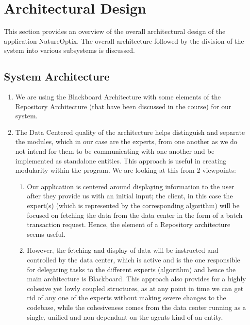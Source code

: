 \documentclass[]{article}
\begin{document}



\section{Architectural Design}
\label{sec:architectural_design}
This section provides an overview of the overall architectural design of the application NatureOptix. The overall architecture followed by the division of the system into various subsystems is discussed.

\subsection{System Architecture}
\label{sub:system_architecture}
\begin{enumerate}[1.]

	\item We are using the Blackboard Architecture with some elements of the Repository Architecture (that have been discussed in the course) for our system.
	\item The Data Centered quality of the architecture helps distinguish and separate the modules, which in our case are the experts, from one another as we do not intend for them to be communicating with one another and be implemented as standalone entities. This approach is useful in creating modularity within the program. We are looking at this from 2 viewpoints:
	\begin{enumerate}[2.1]
		\item Our application is centered around displaying information to the user after they provide us with an initial input; the client, in this case the expert(s) (which is represented by the corresponding algorithm) will be focused on fetching the data from the data center in the form of a batch transaction request. Hence, the element of a Repository architecture seems useful.
		\item However, the fetching and display of data will be instructed and controlled by the data center, which is active and is the one responsible for delegating tasks to the different experts (algorithm) and hence the main architecture is Blackboard. This approach also provides for a highly cohesive yet lowly coupled structures, as at any point in time we can get rid of any one of the experts without making severe changes to the codebase, while the cohesiveness comes from the data center running as a single, unified and non dependant on the agents kind of an entity.

	\end{enumerate}
\end{enumerate}
\end{document}
